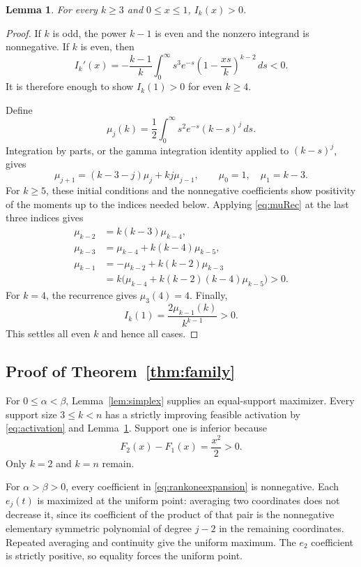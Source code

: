 \documentclass[11pt]{article}
\newtheorem{lemma}[theorem]{Lemma}
\theoremstyle{definition}\newtheorem{definition}[theorem]{Definition}
\theoremstyle{remark}\newtheorem{remark}[theorem]{Remark}
\begin{document}
\begin{lemma}\label{lem:positiveI}
For every $k\geq3$ and $0\leq x\leq1$, $I_k(x)>0$.
\end{lemma}
\begin{proof}
If $k$ is odd, the power $k-1$ is even and the nonzero integrand is nonnegative. If $k$ is even, then
\[
 I_k'(x)=-\frac{k-1}{k}\int_0^\infty s^3e^{-s}
              \left(1-\frac{xs}{k}\right)^{k-2}\,ds<0.
\]
It is therefore enough to show $I_k(1)>0$ for even $k\geq4$.

Define
\[
 \mu_j(k)=\frac12\int_0^\infty s^2e^{-s}(k-s)^j\,ds.
\]
Integration by parts, or the gamma integration identity applied to $(k-s)^j$, gives
\begin{equation}\label{eq:muRec}
 \mu_{j+1}=(k-3-j)\mu_j+kj\mu_{j-1},\qquad
 \mu_0=1,\quad\mu_1=k-3.
\end{equation}
For $k\geq5$, these initial conditions and the nonnegative coefficients show positivity of the moments up to the indices needed below. Applying \eqref{eq:muRec} at the last three indices gives
\begin{align*}
 \mu_{k-2}&=k(k-3)\mu_{k-4},\\
 \mu_{k-3}&=\mu_{k-4}+k(k-4)\mu_{k-5},\\
 \mu_{k-1}&=-\mu_{k-2}+k(k-2)\mu_{k-3}\\
 &=k\bigl(\mu_{k-4}+k(k-2)(k-4)\mu_{k-5}\bigr)>0.
\end{align*}
For $k=4$, the recurrence gives $\mu_3(4)=4$. Finally,
\[
 I_k(1)=\frac{2\mu_{k-1}(k)}{k^{k-1}}>0.
\]
This settles all even $k$ and hence all cases.
\end{proof}

\subsection{Proof of Theorem~\ref{thm:family}}
For $0\leq\alpha<\beta$, Lemma~\ref{lem:simplex} supplies an equal-support maximizer. Every support size $3\leq k<n$ has a strictly improving feasible activation by \eqref{eq:activation} and Lemma~\ref{lem:positiveI}. Support one is inferior because
\[
 F_2(x)-F_1(x)=\frac{x^2}{2}>0.
\]
Only $k=2$ and $k=n$ remain.

For $\alpha>\beta>0$, every coefficient in \eqref{eq:rankoneexpansion} is nonnegative. Each $e_j(t)$ is maximized at the uniform point: averaging two coordinates does not decrease it, since its coefficient of the product of that pair is the nonnegative elementary symmetric polynomial of degree $j-2$ in the remaining coordinates. Repeated averaging and continuity give the uniform maximum. The $e_2$ coefficient is strictly positive, so equality forces the uniform point.
\end{document}
